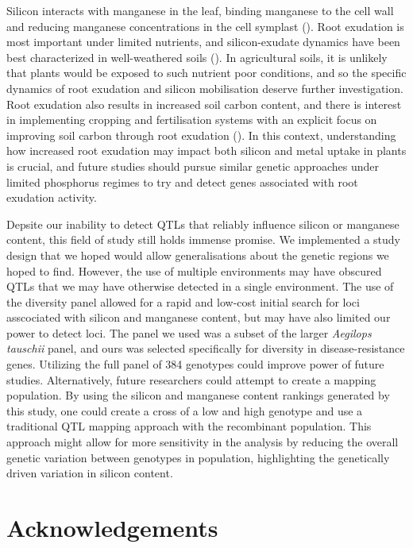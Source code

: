 \documentclass[12pt, letterpaper, ]{report}
\begin{document}
Silicon interacts with manganese in the leaf, binding manganese to the cell wall and reducing manganese concentrations in the cell symplast (\cite{rogalla_role_2002}). Root exudation is most important under limited nutrients, and silicon-exudate dynamics have been best characterized in well-weathered soils (\cite{lambers_plant_2008,de_tombeur_shift_2021,de_tombeur_silicon_2021-1}). In agricultural soils, it is unlikely that plants would be exposed to such nutrient poor conditions, and so the specific dynamics of root exudation and silicon mobilisation deserve further investigation. Root exudation also results in increased soil carbon content, and there is interest in implementing cropping and fertilisation systems with an explicit focus on improving soil carbon through root exudation (\cite{cornelis_soil_2022}). In this context, understanding how increased root exudation may impact both silicon and metal uptake in plants is crucial, and future studies should pursue similar genetic approaches under limited phosphorus regimes to try and detect genes associated with root exudation activity. 

Depsite our inability to detect QTLs that reliably influence silicon or manganese content, this field of study still holds immense promise. We implemented a study design that we hoped would allow generalisations about the genetic regions we hoped to find. However, the use of multiple environments may have obscured QTLs that we may have otherwise detected in a single environment. The use of the diversity panel allowed for a rapid and low-cost initial search for loci asscociated with silicon and manganese content, but may have also limited our power to detect loci. The panel we used was a subset of the larger \textit{Aegilops tauschii} panel, and ours was selected specifically for diversity in disease-resistance genes. Utilizing the full panel of 384 genotypes could improve power of future studies. Alternatively, future researchers could attempt to create a mapping population. By using the silicon and manganese content rankings generated by this study, one could create a cross of a low and high genotype and use a traditional QTL mapping approach with the recombinant population. This approach might allow for more sensitivity in the analysis by reducing the overall genetic variation between genotypes in population, highlighting the genetically driven variation in silicon content.
\section{Acknowledgements}
\end{document}
